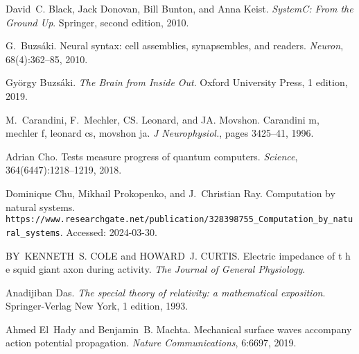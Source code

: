 \begin{DoxyDescription}
\item[\label{citelist_CITEREF_SystemCBook:2010}%
\mbox{[}9\mbox{]}]David~C. Black, Jack Donovan, Bill Bunton, and Anna Keist. {\itshape SystemC\+: From the Ground Up}. Springer, second edition, 2010.


\item[\label{citelist_CITEREF_BuzsakiCellAssemblies:2010}%
\mbox{[}10\mbox{]}]G.~Buzs\'{a}ki. Neural syntax\+: cell assemblies, synapsembles, and readers. {\itshape Neuron}, 68(4)\+:362--85, 2010. 


\item[\label{citelist_CITEREF_BuzsakiTheBrain:2019}%
\mbox{[}11\mbox{]}]Gy\"{o}rgy Buzs\'{a}ki. {\itshape The Brain from Inside Out}. Oxford University Press, 1 edition, 2019.


\item[\label{citelist_CITEREF_LowPassFilter_Carandini:1996}%
\mbox{[}12\mbox{]}]M.~Carandini, F.~Mechler, CS. Leonard, and JA. Movshon. Carandini m, mechler f, leonard cs, movshon ja. {\itshape J Neurophysiol.}, pages 3425--41, 1996. 


\item[\label{citelist_CITEREF_ScienceQuantumComputers:2018}%
\mbox{[}13\mbox{]}]Adrian Cho. Tests measure progress of quantum computers. {\itshape Science}, 364(6447)\+:1218--1219, 2018. 


\item[\label{citelist_CITEREF_NaturalComputation:2018}%
\mbox{[}14\mbox{]}]Dominique Chu, Mikhail Prokopenko, and J.~Christian Ray. Computation by natural systems. {\texttt{ https\+://www.\+researchgate.\+net/publication/328398755\+\_\+\+Computation\+\_\+by\+\_\+natural\+\_\+systems}}. Accessed\+: 2024-\/03-\/30. 


\item[\label{citelist_CITEREF_COLE_CURTIS_IMPEDANCE:1939}%
\mbox{[}15\mbox{]}]BY~KENNETH~S. COLE and HOWARD~J. CURTIS. Electric impedance of t h e squid giant axon during activity. {\itshape The Journal of General Physiology}. 


\item[\label{citelist_CITEREF_ModernRelativity:1993}%
\mbox{[}16\mbox{]}]Anadijiban Das. {\itshape The special theory of relativity\+: a mathematical exposition}. Springer-\/\+Verlag New York, 1 edition, 1993.


\item[\label{citelist_CITEREF_MechanicalWaves:2015}%
\mbox{[}17\mbox{]}]Ahmed El~Hady and Benjamin~B. Machta. Mechanical surface waves accompany action potential propagation. {\itshape Nature Communications}, 6\+:6697, 2019. 



\end{DoxyDescription}
